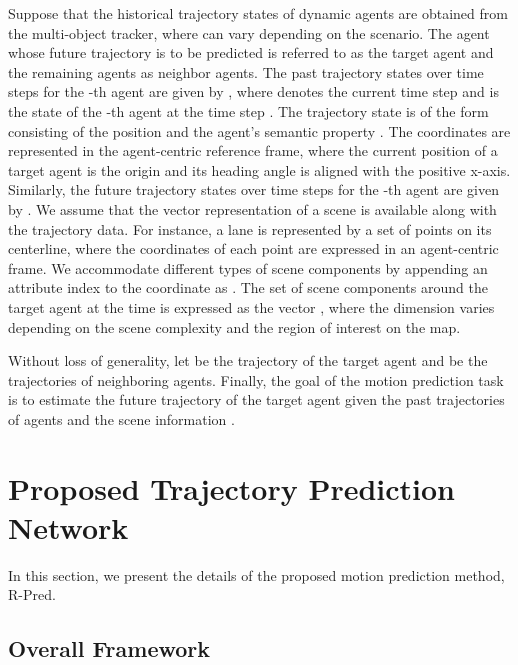 \documentclass[10pt,twocolumn,letterpaper]{article}
\begin{document}
Suppose that the historical trajectory states of  dynamic agents are obtained from the multi-object tracker, where  can vary depending on the scenario. The agent whose future trajectory is to be predicted is referred to as the target agent and the remaining agents as neighbor agents. The past trajectory states over  time steps for the -th agent are given by , where  denotes the current time step and    is the state of the -th agent at the time step . The trajectory state is of the form  consisting of the  position and the agent's semantic property . The  coordinates are represented in the agent-centric reference frame, where the current position of a target agent is the origin and its heading angle is aligned with the positive x-axis.    Similarly, the future trajectory states over  time steps for the -th agent are given by 
.    
We assume that the vector representation of a scene is available along with the trajectory data.  For instance, a lane is represented by a set of points on its centerline, where the   coordinates of each point are expressed in an agent-centric frame. We accommodate different types of scene components by appending an  attribute index  to the  coordinate   as . The set of scene components around the target agent at the time  is expressed as the vector , where the dimension  varies depending on the scene complexity and the region of interest on the map.  


Without loss of generality, let  be the trajectory of the target agent and  be the trajectories of neighboring agents. 
Finally, the goal of the motion prediction task is to estimate the future trajectory of the target agent 
 given the past trajectories of  agents  and the scene information . 

\section{Proposed Trajectory Prediction Network}
\label{sec: methods}

In this section, we present the details of the proposed motion prediction method, R-Pred.



\subsection{Overall Framework}
\end{document}

